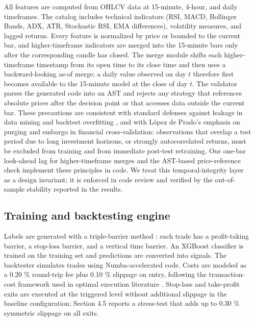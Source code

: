\documentclass[analytics,article,submit,pdftex,moreauthors]{Definitions/mdpi}
\begin{document}
All features are computed from OHLCV data at 15-minute, 4-hour, and daily timeframes. The catalog includes technical indicators (RSI, MACD, Bollinger Bands, ADX, ATR, Stochastic RSI, EMA differences), volatility measures, and lagged returns. Every feature is normalized by price or bounded to the current bar, and higher-timeframe indicators are merged into the 15-minute bars only after the corresponding candle has closed. The merge module shifts each higher-timeframe timestamp from its open time to its close time and then uses a backward-looking as-of merge; a daily value observed on day \(t\) therefore first becomes available to the 15-minute model at the close of day \(t\). The validator parses the generated code into an AST and rejects any strategy that references absolute prices after the decision point or that accesses data outside the current bar. These precautions are consistent with standard defenses against leakage in data mining \citep{kaufman_2012} and backtest overfitting \citep{bailey_2017}, and with L\'{o}pez de Prado's \citep{prado_2018} emphasis on purging and embargo in financial cross-validation: observations that overlap a test period due to long investment horizons, or strongly autocorrelated returns, must be excluded from training and from immediate post-test retraining. Our one-bar look-ahead lag for higher-timeframe merges and the AST-based price-reference check implement these principles in code. We treat this temporal-integrity layer as a design invariant; it is enforced in code review and verified by the out-of-sample stability reported in the results.

\subsection{Training and backtesting engine}\label{training-and-backtesting-engine}

Labels are generated with a triple-barrier method \citep{prado_2018}: each trade has a profit-taking barrier, a stop-loss barrier, and a vertical time barrier. An XGBoost classifier \citep{chen_2016} is trained on the training set and predictions are converted into signals. The backtester simulates trades using Numba-accelerated code. Costs are modeled as a 0.20 \% round-trip fee plus 0.10 \% slippage on entry, following the transaction-cost framework used in optimal execution literature \citep{almgren_2001}. Stop-loss and take-profit exits are executed at the triggered level without additional slippage in the baseline configuration; Section 4.5 reports a stress-test that adds up to 0.30 \% symmetric slippage on all exits.
\end{document}
